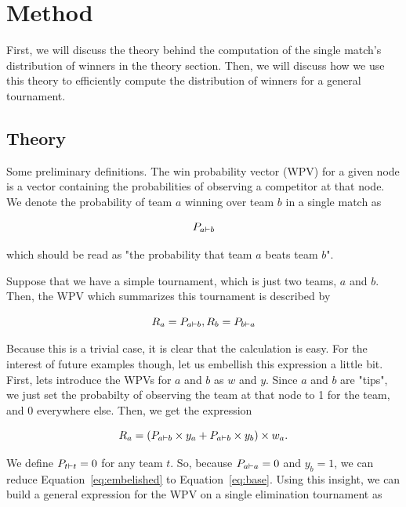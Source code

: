 \documentclass{article}
\begin{document}
\section{Method}

First, we will discuss the theory behind the computation of the single match's distribution of winners in the theory
section. Then, we will discuss how we use this theory to efficiently compute the distribution of winners for a general
tournament.

\subsection{Theory}

Some preliminary definitions. The win probability vector (WPV) for a given node is a vector containing the
probabilities of observing a competitor at that node. We denote the probability of team $a$ winning over team $b$ in a
single match as 

\begin{equation*}
P_{a \vdash b}
\end{equation*}

which should be read as "the probability that team $a$ beats team $b$".

Suppose that we have a simple tournament, which is just two teams, $a$ and $b$. Then, the WPV which summarizes this
tournament is described by 

\begin{equation}
R_a = P_{a \vdash b}, R_b = P_{b \vdash a}
\label{eq:base}
\end{equation}

Because this is a trivial case, it is clear that the calculation is easy. For the interest of future examples though,
let us embellish this expression a little bit. First, lets introduce the WPVs for $a$ and $b$ as $w$ and $y$. Since $a$
and $b$ are "tips", we just set the probabilty of observing the team at that node to 1 for the team, and 0 everywhere
else. Then, we get the expression

\begin{equation}
R_a = (P_{a \vdash b} \times y_a + P_{a \vdash b} \times y_b) \times w_a.
\label{eq:embelished}
\end{equation}

We define $P_{t \vdash t} = 0$ for any team $t$. So, because $P_{a \vdash a} = 0$ and $y_b = 1$, we can reduce
Equation~\ref{eq:embelished} to Equation~\ref{eq:base}. Using this insight, we can build a general expression for the
WPV on a single elimination tournament as
\end{document}
